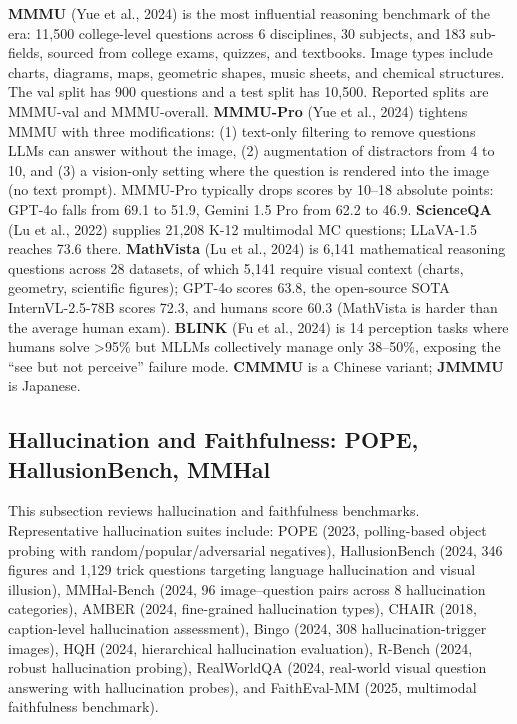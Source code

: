 \textbf{MMMU} (Yue et al., 2024) is the most influential reasoning benchmark of the era: 11,500 college-level questions across 6 disciplines, 30 subjects, and 183 sub-fields, sourced from college exams, quizzes, and textbooks. Image types include charts, diagrams, maps, geometric shapes, music sheets, and chemical structures. The val split has 900 questions and a test split has 10,500. Reported splits are MMMU-val and MMMU-overall. \textbf{MMMU-Pro} (Yue et al., 2024) tightens MMMU with three modifications: (1) text-only filtering to remove questions LLMs can answer without the image, (2) augmentation of distractors from 4 to 10, and (3) a vision-only setting where the question is rendered into the image (no text prompt). MMMU-Pro typically drops scores by 10--18 absolute points: GPT-4o falls from 69.1 to 51.9, Gemini 1.5 Pro from 62.2 to 46.9. \textbf{ScienceQA} (Lu et al., 2022) supplies 21,208 K-12 multimodal MC questions; LLaVA-1.5 reaches 73.6 there. \textbf{MathVista} (Lu et al., 2024) is 6,141 mathematical reasoning questions across 28 datasets, of which 5,141 require visual context (charts, geometry, scientific figures); GPT-4o scores 63.8, the open-source SOTA InternVL-2.5-78B scores 72.3, and humans score 60.3 (MathVista is harder than the average human exam). \textbf{BLINK} (Fu et al., 2024) is 14 perception tasks where humans solve \textgreater95\% but MLLMs collectively manage only 38--50\%, exposing the ``see but not perceive'' failure mode. \textbf{CMMMU} is a Chinese variant; \textbf{JMMMU} is Japanese.

\subsection{Hallucination and Faithfulness: POPE, HallusionBench, MMHal}\label{hallucination-and-faithfulness-pope-hallusionbench-mmhal}

This subsection reviews hallucination and faithfulness benchmarks. Representative hallucination suites include: POPE (2023, polling-based object probing with random/popular/adversarial negatives), HallusionBench (2024, 346 figures and 1,129 trick questions targeting language hallucination and visual illusion), MMHal-Bench (2024, 96 image--question pairs across 8 hallucination categories), AMBER (2024, fine-grained hallucination types), CHAIR (2018, caption-level hallucination assessment), Bingo (2024, 308 hallucination-trigger images), HQH (2024, hierarchical hallucination evaluation), R-Bench (2024, robust hallucination probing), RealWorldQA (2024, real-world visual question answering with hallucination probes), and FaithEval-MM (2025, multimodal faithfulness benchmark).

